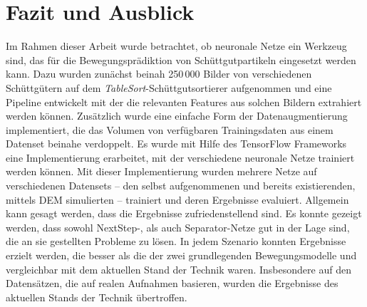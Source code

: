 \chapter{Fazit und Ausblick}
\label{cap:fazit}

Im Rahmen dieser Arbeit wurde betrachtet, ob neuronale Netze ein Werkzeug sind, das für die Bewegungsprädiktion von Schüttgutpartikeln eingesetzt werden kann.
Dazu wurden zunächst beinah 250\,000 Bilder von verschiedenen Schüttgütern auf dem \textit{TableSort}-Schüttgutsortierer aufgenommen 
und eine Pipeline entwickelt mit der die relevanten Features aus solchen Bildern extrahiert werden können.
Zusätzlich wurde eine einfache Form der Datenaugmentierung implementiert, die das Volumen von verfügbaren Trainingsdaten aus einem Datenset beinahe verdoppelt.
Es wurde mit Hilfe des TensorFlow Frameworks eine Implementierung erarbeitet, mit der verschiedene neuronale Netze trainiert werden können.
Mit dieser Implementierung wurden mehrere Netze auf verschiedenen Datensets -- den selbst aufgenommenen und bereits existierenden, mittels DEM simulierten -- trainiert und deren Ergebnisse evaluiert.
Allgemein kann gesagt werden, dass die Ergebnisse zufriedenstellend sind.
Es konnte gezeigt werden, dass sowohl NextStep-, als auch Separator-Netze gut in der Lage sind, die an sie gestellten Probleme zu lösen.
In jedem Szenario konnten Ergebnisse erzielt werden, die besser als die der zwei grundlegenden Bewegungsmodelle
und vergleichbar mit dem aktuellen Stand der Technik waren.
Insbesondere auf den Datensätzen, die auf realen Aufnahmen basieren, wurden die Ergebnisse des aktuellen Stands der Technik übertroffen.





